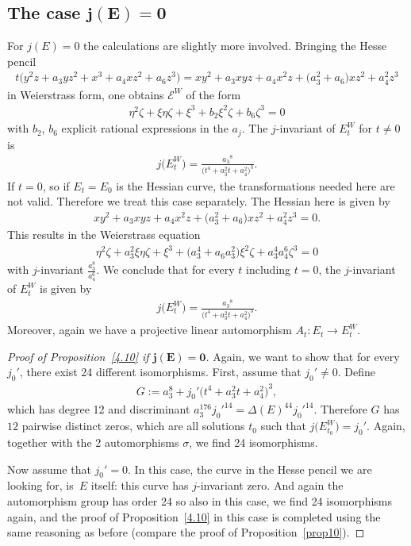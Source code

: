 \documentclass[pdftex]{sigma}
\numberwithin{equation}{section}
\begin{document}
\subsection[The case $j(E) = 0$]{The case $\boldsymbol{j(E) = 0}$}

For $j(E)=0$ the calculations are slightly more involved. Bringing the Hesse pencil
\begin{gather*}
t\big(y^2z + a_3yz^2 + x^3 + a_4xz^2 + a_6z^3\big) = xy^2 + a_3 xyz+ a_4 x^2z + \big(a_3^2 + a_6\big)xz^2 + a_4^2z^3
\end{gather*}
in Weierstrass form, one obtains $\mathcal{E}^W$ of the form
\begin{gather*}
\eta^2\zeta + \xi \eta \zeta + \xi^3 +b_2 \xi^2 \zeta + b_6 \zeta^3 = 0
\end{gather*}
with $b_2$, $b_6$ explicit rational expressions in the $a_j$. The $j$-invariant of $E_t^W$ for $t \neq0$ is
\begin{gather*}
j\big(E^W_t\big) = \frac{{a_3}^8}{\big(t^4+a_3^2t+a_4^2\big)^3}.
\end{gather*}
If $t=0$, so if $E_t=E_0$ is the Hessian curve, the transformations needed here are not valid. Therefore we treat this case separately. The Hessian here is given by
\begin{gather*}xy^2 + a_3xyz + a_4x^2z + \big(a_3^2 + a_6\big)xz^2 + a_4^2z^3=0.\end{gather*}
This results in the Weierstrass equation
\begin{gather*}\eta^2\zeta + a_3^2\xi \eta\zeta + \xi^3+ \big({a_3^4 + a_6}{a_3^2}\big)\xi^2\zeta + {a_3^4a_4^6 }\zeta^3=0\end{gather*}
with $j$-invariant $\frac{a_3^8}{a_4^6}$. We conclude that for every $t$ including $t=0$, the $j$-invariant of $E_t^W$ is given by
\begin{gather*}
j\big(E_t^W\big) = \frac{{a_3}^8}{\big(t^4+a_3^2t+a_4^2\big)^3}.
\end{gather*}
Moreover, again we have a projective linear automorphism $A_t\colon E_t\to E_t^W$.

\begin{proof}[Proof of Proposition~\ref{4.10} if $\boldsymbol{j(E) = 0}$] Again, we want to show that for every $j_0'$, there exist 24 different isomorphisms. First, assume that $j_0' \neq 0$. Define
\begin{gather*} G:=a_3^8 + j_0'\big(t^4+a_3^2t+a_4^2\big)^3 ,
\end{gather*}
which has degree 12 and discriminant $a_3^{176}j_0'^{14} = \Delta (E)^{44} j_0'^{14}$. Therefore $G$ has $12$ pairwise distinct zeros, which are all solutions $t_0$ such that $j\big(E^W_{t_0}\big)=j_0'$. Again, together with the 2 automorphisms $\sigma$, we find 24 isomorphisms.

Now assume that $j_0'=0$. In this case, the curve in the Hesse pencil we are looking for, is~$E$ itself: this curve has $j$-invariant zero. And again the automorphism group has order 24 so also in this case, we find 24 isomorphisms again, and the proof of Proposition~\ref{4.10} in this case is completed using the same reasoning as before (compare the proof of Proposition~\ref{prop10}).
\end{proof}
\end{document}
